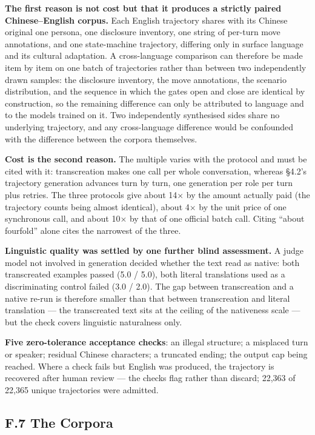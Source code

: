 \documentclass[letterpaper]{article}
\begin{document}
\textbf{The first reason is not cost but that it produces a strictly paired Chinese--English corpus.} Each English trajectory shares with its Chinese original one persona, one disclosure inventory, one string of per-turn move annotations, and one state-machine trajectory, differing only in surface language and its cultural adaptation. A cross-language comparison can therefore be made item by item on one batch of trajectories rather than between two independently drawn samples: the disclosure inventory, the move annotations, the scenario distribution, and the sequence in which the gates open and close are identical by construction, so the remaining difference can only be attributed to language and to the models trained on it. Two independently synthesised sides share no underlying trajectory, and any cross-language difference would be confounded with the difference between the corpora themselves.

\textbf{Cost is the second reason.} The multiple varies with the protocol and must be cited with it: transcreation makes one call per whole conversation, whereas \S{}4.2's trajectory generation advances turn by turn, one generation per role per turn plus retries. The three protocols give about 14$\times$ by the amount actually paid (the trajectory counts being almost identical), about 4$\times$ by the unit price of one synchronous call, and about 10$\times$ by that of one official batch call. Citing ``about fourfold'' alone cites the narrowest of the three.

\textbf{Linguistic quality was settled by one further blind assessment.} A judge model not involved in generation decided whether the text read as native: both transcreated examples passed (5.0 / 5.0), both literal translations used as a discriminating control failed (3.0 / 2.0). The gap between transcreation and a native re-run is therefore smaller than that between transcreation and literal translation --- the transcreated text sits at the ceiling of the nativeness scale --- but the check covers linguistic naturalness only.

\textbf{Five zero-tolerance acceptance checks}: an illegal structure; a misplaced turn or speaker; residual Chinese characters; a truncated ending; the output cap being reached. Where a check fails but English was produced, the trajectory is recovered after human review --- the checks flag rather than discard; 22,363 of 22,365 unique trajectories were admitted.


\subsection*{F.7 The Corpora}
\end{document}
